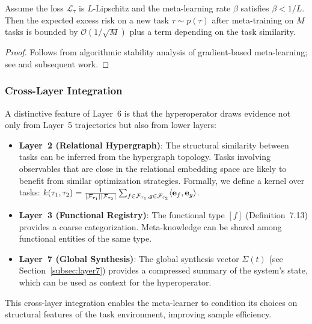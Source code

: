 \begin{proposition}
\label{prop:maml_bound}
Assume the loss $\mathcal{L}_\tau$ is $L$-Lipschitz and the meta-learning rate $\beta$ satisfies $\beta < 1/L$. Then the expected excess risk on a new task $\tau \sim p(\tau)$ after meta-training on $M$ tasks is bounded by $\mathcal{O}(1/\sqrt{M})$ plus a term depending on the task similarity.
\end{proposition}
\begin{proof}
Follows from algorithmic stability analysis of gradient-based meta-learning; see \cite{finn2017} and subsequent work.
\end{proof}

\subsubsection{Cross-Layer Integration}
A distinctive feature of Layer~6 is that the hyperoperator draws evidence not only from Layer~5 trajectories but also from lower layers:

\begin{itemize}
    \item \textbf{Layer~2 (Relational Hypergraph)}: The structural similarity between tasks can be inferred from the hypergraph topology. Tasks involving observables that are close in the relational embedding space are likely to benefit from similar optimization strategies. Formally, we define a kernel over tasks: $k(\tau_1, \tau_2) = \frac{1}{|\mathcal{F}_{\tau_1}||\mathcal{F}_{\tau_2}|} \sum_{f \in \mathcal{F}_{\tau_1}, g \in \mathcal{F}_{\tau_2}} \langle \mathbf{e}_f, \mathbf{e}_g \rangle$.
    \item \textbf{Layer~3 (Functional Registry)}: The functional type $[f]$ (Definition~7.13) provides a coarse categorization. Meta-knowledge can be shared among functional entities of the same type.
    \item \textbf{Layer~7 (Global Synthesis)}: The global synthesis vector $\Sigma(t)$ (see Section~\ref{subsec:layer7}) provides a compressed summary of the system's state, which can be used as context for the hyperoperator.
\end{itemize}

This cross-layer integration enables the meta-learner to condition its choices on structural features of the task environment, improving sample efficiency.


